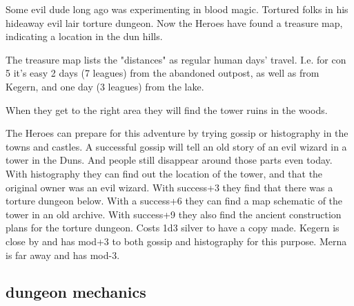 Some evil dude long ago was experimenting in blood magic. Tortured folks in his hideaway evil lair torture dungeon. Now the Heroes have found a treasure map, indicating a location in the dun hills.

The treasure map lists the "distances" as regular human days' travel. I.e. for con 5 it's easy 2 days (7 leagues) from the abandoned outpost, as well as from Kegern, and one day (3 leagues) from the lake.

When they get to the right area they will find the tower ruins in the woods.

The Heroes can prepare for this adventure by trying gossip or histography in the towns and castles. A successful gossip will tell an old story of an evil wizard in a tower in the Duns. And people still disappear around those parts even today. With histography they can find out the location of the tower, and that the original owner was an evil wizard. With success+3 they find that there was a torture dungeon below. With a success+6 they can find a map schematic of the tower in an old archive. With success+9 they also find the ancient construction plans for the torture dungeon. Costs 1d3 silver to have a copy made. Kegern is close by and has mod+3 to both gossip and histography for this purpose. Merna is far away and has mod-3.


\subsection*{dungeon mechanics}

